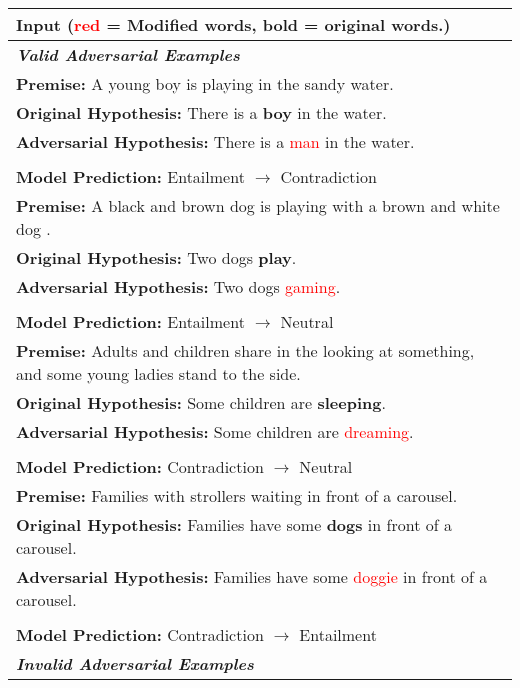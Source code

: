 \documentclass{article} \usepackage{iclr2021_conference,times}
\theoremstyle{definition}
\theoremstyle{remark}
\begin{document}
\begin{table}[htp!]\small \setlength{\tabcolsep}{7pt}
\centering
\begin{tabular}{p{13.8cm}}
\toprule Input (\textcolor{red}{red} = Modified words, \textbf{bold} = original words.) \\
\midrule
\midrule
\textbf{\textit{Valid Adversarial Examples} }\\
\midrule 

\textbf{Premise:} A young boy is playing in the sandy water.\\
\textbf{Original Hypothesis: } There is a \textbf{boy} in the water. \\
\textbf{Adversarial Hypothesis: } There is a \textcolor{red}{man} in the water. \\
\\
\textbf{Model Prediction: } Entailment $\rightarrow$ Contradiction \\
\midrule

\textbf{Premise:} A black and brown dog is playing with a brown and white dog .\\
\textbf{Original Hypothesis: } Two dogs \textbf{play}. \\
\textbf{Adversarial Hypothesis: } Two dogs \textcolor{red}{gaming}. \\
\\
\textbf{Model Prediction: } Entailment $\rightarrow$ Neutral \\
\midrule

\textbf{Premise:} Adults and children share in the looking at something, and some young ladies stand to the side.\\
\textbf{Original Hypothesis: } Some children are \textbf{sleeping}. \\
\textbf{Adversarial Hypothesis: } Some children are \textcolor{red}{dreaming}. \\
\\
\textbf{Model Prediction: } Contradiction $\rightarrow$ Neutral \\
\midrule

\textbf{Premise:} Families with strollers waiting in front of a carousel.\\
\textbf{Original Hypothesis: } Families have some \textbf{dogs} in front of a carousel. \\
\textbf{Adversarial Hypothesis: } Families have some \textcolor{red}{doggie} in front of a carousel. \\
\\
\textbf{Model Prediction: } Contradiction $\rightarrow$ Entailment \\
\midrule 
\midrule 
\textbf{\textit{Invalid Adversarial Examples }}\\
\midrule 


\end{tabular}
\end{table}
\end{document}
